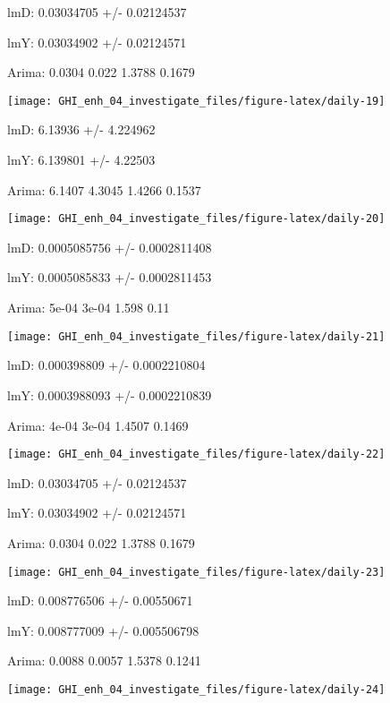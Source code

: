 \documentclass[
  10pt,
  a4paper,oneside]{article}
\begin{document}
lmD: 0.03034705 +/- 0.02124537

lmY: 0.03034902 +/- 0.02124571

Arima: 0.0304 0.022 1.3788 0.1679

\begin{center}\texttt{[image: GHI\_enh\_04\_investigate\_files/figure-latex/daily-19]} \end{center}

lmD: 6.13936 +/- 4.224962

lmY: 6.139801 +/- 4.22503

Arima: 6.1407 4.3045 1.4266 0.1537

\begin{center}\texttt{[image: GHI\_enh\_04\_investigate\_files/figure-latex/daily-20]} \end{center}

lmD: 0.0005085756 +/- 0.0002811408

lmY: 0.0005085833 +/- 0.0002811453

Arima: 5e-04 3e-04 1.598 0.11

\begin{center}\texttt{[image: GHI\_enh\_04\_investigate\_files/figure-latex/daily-21]} \end{center}

lmD: 0.000398809 +/- 0.0002210804

lmY: 0.0003988093 +/- 0.0002210839

Arima: 4e-04 3e-04 1.4507 0.1469

\begin{center}\texttt{[image: GHI\_enh\_04\_investigate\_files/figure-latex/daily-22]} \end{center}

lmD: 0.03034705 +/- 0.02124537

lmY: 0.03034902 +/- 0.02124571

Arima: 0.0304 0.022 1.3788 0.1679

\begin{center}\texttt{[image: GHI\_enh\_04\_investigate\_files/figure-latex/daily-23]} \end{center}

lmD: 0.008776506 +/- 0.00550671

lmY: 0.008777009 +/- 0.005506798

Arima: 0.0088 0.0057 1.5378 0.1241

\begin{center}\texttt{[image: GHI\_enh\_04\_investigate\_files/figure-latex/daily-24]} \end{center}
\end{document}
